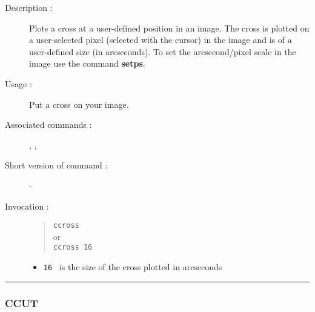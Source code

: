 \begin{description}

\item[Description :] Plots a cross at a user-defined position in an image.
The cross is plotted on a user-selected pixel (selected with the
cursor) in the image and is of a user-defined size (in arcseconds).  To
set the arcsecond/pixel scale in the image use the command {\bf setps}.

\item[Usage :] Put a cross on your image.
\item[Associated commands :] {\tt {}}, 
{\tt {}}, {\tt {}}
\item[Short version of command :] -
\item[Invocation :]

\begin{quote}{\tt  ccross }\\
or \\
{\tt  ccross 16 }
\end{quote}

\begin{itemize}

\item {\tt 16 } is the size of the cross plotted in arcseconds

\end{itemize}

\end{description}

\hrule 
\subsubsection*{\label{CCUT}CCUT}

